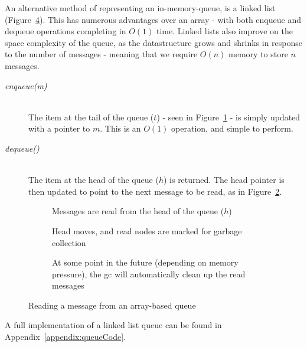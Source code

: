 An alternative method of representing an in-memory-queue, is a linked list
(Figure~\ref{fig:tikz:queueLinkedList}). This has numerous advantages over an
array - with both enqueue and dequeue operations completing in $O(1)$ time.
Linked lists also improve on the space complexity of the queue, as the
datastructure grows and shrinks in response  to the number of messages - meaning
that we require $O(n)$ memory to store $n$ messages.

\begin{description}
  \item[\textit{enqueue(m)}] \hfill \\
    The item at the tail of the queue ($t$) - seen in
    Figure~\ref{fig:tikz:queueLinkedListInitial} - is simply updated with a
    pointer to $m$. This is an $O(1)$ operation, and simple to perform.
  \item[\textit{dequeue()}] \hfill \\
    The item at the head of the queue ($h$) is returned. The head pointer is
    then updated to point to the next message to be read, as in
    Figure~\ref{fig:tikz:queueLinkedListHeadRead}.
\end{description}

\begin{figure}[H]
  \centering
  \begin{subfigure}[b]{\textwidth}
    \centering
    
    \caption{Messages are read from the head of the queue ($h$)}
    \label{fig:tikz:queueLinkedListInitial}
  \end{subfigure}

  \begin{subfigure}[b]{\textwidth}
    \centering
    
    \caption{Head moves, and read nodes are marked for garbage collection}
    \label{fig:tikz:queueLinkedListHeadRead}
  \end{subfigure}

  \begin{subfigure}[b]{\textwidth}
    \centering
    
    \caption{At some point in the future (depending on memory pressure), the
             \gls{gc} will automatically clean up the read messages}
    \label{fig:tikz:queueLinkedListGCRun}
  \end{subfigure}
  \caption{Reading a message from an array-based queue}
  \label{fig:tikz:queueLinkedList}
\end{figure}

A full implementation of a linked list queue can be found in
Appendix~\ref{appendix:queueCode}.

